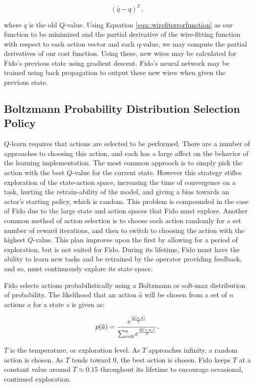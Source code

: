 \begin{equation}
	(\hat{q} - q)^2
	\,,
	\label{equ::wirefiterrorfunction}
\end{equation}

\noindent

where $q$ is the old $Q$-value. Using Equation \ref{equ::wirefiterrorfunction} as our function to be minimized and the partial derivative of the wire-fitting function with respect to each action vector and each q-value, we may compute the partial derivatives of our cost function. Using these, new wires may be calculated for Fido's previous state using gradient descent. Fido's neural network may be trained using back propagation to output these new wires when given the previous state.

\subsection{Boltzmann Probability Distribution Selection Policy}

$Q$-learn requires that actions are selected to be performed. There are a number of approaches to choosing this action, and each has a large affect on the behavior of the learning implementation. The most common approach is to simply pick the action with the best $Q$-value for the current state. However this strategy stifles exploration of the state-action space, increasing the time of convergence on a task, hurting the retrain-ability of the model, and giving a bias towards an actor's starting policy, which is random. This problem is compounded in the case of Fido due to the large state and action spaces that Fido must explore. Another common method of action selection is to choose each action randomly for a set number of reward iterations, and then to switch to choosing the action with the highest $Q$-value. This plan improves upon the first by allowing for a period of exploration, but is not suited for Fido. During its lifetime, Fido must have the ability to learn new tasks and be retrained by the operator providing feedback, and so, must continuously explore its state space.

Fido selects actions probabilistically using a Boltzmann or soft-max distribution of probability. The likelihood that an action $\hat{a}$ will be chosen from a set of $n$ actions $a$ for a state $s$ is given as:

\begin{equation}
	p(\hat{a}) = \cfrac{e^{\frac{Q(s, \hat{a})}{T}}}{\sum_{i=0}^{n}e^{\frac{Q(s, a_i)}{T}}}
	\,.
	\label{equ::boltzmann}
\end{equation}

$T$ is the temperature, or exploration level. As $T$ approaches infinity, a random action is chosen. As $T$ tends toward 0, the best action is chosen. Fido keeps $T$ at a constant value around $T \approx 0.15$ throughout its lifetime to encourage occasional, continued exploration.
